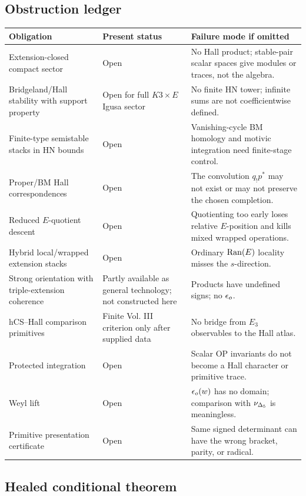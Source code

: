 \subsection{Obstruction ledger}

\begin{center}
\small
\begin{tabular}{p{}p{}p{}}
\hline
Obligation & Present status & Failure mode if omitted \\
\hline
Extension-closed compact sector &
Open &
No Hall product; stable-pair scalar spaces give modules or traces, not
the algebra. \\
Bridgeland/Hall stability with support property &
Open for full \(K3\times E\) Igusa sector &
No finite HN tower; infinite sums are not coefficientwise defined. \\
Finite-type semistable stacks in HN bounds &
Open &
Vanishing-cycle BM homology and motivic integration need finite-stage
control. \\
Proper/BM Hall correspondences &
Open &
The convolution \(q_!p^*\) may not exist or may not preserve the chosen
completion. \\
Reduced \(E\)-quotient descent &
Open &
Quotienting too early loses relative \(E\)-position and kills mixed
wrapped operations. \\
Hybrid local/wrapped extension stacks &
Open &
Ordinary \(\operatorname{Ran}(E)\) locality misses the \(s\)-direction. \\
Strong orientation with triple-extension coherence &
Partly available as general technology; not constructed here &
Products have undefined signs; no \(\epsilon_o\). \\
hCS--Hall comparison primitives &
Finite Vol. III criterion only after supplied data &
No bridge from \(E_3\) observables to the Hall atlas. \\
Protected integration &
Open &
Scalar OP invariants do not become a Hall character or primitive trace. \\
Weyl lift &
Open &
\(\epsilon_o(w)\) has no domain; comparison with \(\nu_{\Delta_5}\) is meaningless. \\
Primitive presentation certificate &
Open &
Same signed determinant can have the wrong bracket, parity, or radical. \\
\hline
\end{tabular}
\end{center}

\subsection{Healed conditional theorem}

